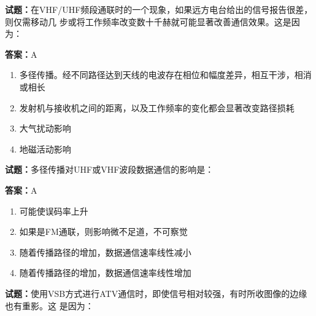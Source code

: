 \documentclass{ctexbook}
\begin{document}




\vspace{1em}

\textbf{试题：}在VHF/UHF频段通联时的一个现象，如果远方电台给出的信号报告很差，则仅需移动几
步或将工作频率改变数十千赫就可能显著改善通信效果。这是因为： 

\textbf{答案：}A 

\begin{enumerate}[leftmargin=3em]
  \item 多径传播。经不同路径达到天线的电波存在相位和幅度差异，相互干涉，相消或相长 

  \item 发射机与接收机之间的距离，以及工作频率的变化都会显著改变路径损耗 

  \item 大气扰动影响 

  \item 地磁活动影响 

\end{enumerate}





\vspace{1em}

\textbf{试题：}多径传播对UHF或VHF波段数据通信的影响是： 

\textbf{答案：}A 

\begin{enumerate}[leftmargin=3em]
  \item 可能使误码率上升 

  \item 如果是FM通联，则影响微不足道，不可察觉 

  \item 随着传播路径的增加，数据通信速率线性减小 

  \item 随着传播路径的增加，数据通信速率线性增加 

\end{enumerate}





\vspace{1em}

\textbf{试题：}使用VSB方式进行ATV通信时，即使信号相对较强，有时所收图像的边缘也有重影。这
是因为： 
\end{document}
